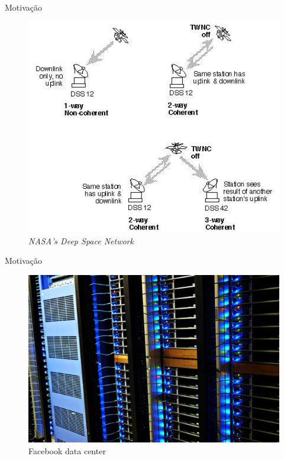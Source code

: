 
  \begin{frame}{Motivação}
   \begin{figure}[h]
     \centering
     \includegraphics[scale=.4]{bsfii6.jpg}
     \caption{\emph{NASA's Deep Space Network}\cite{JPLCIT:2012}}
     \label{fig2:nasa}
   \end{figure}
  \end{frame}

  \begin{frame}{Motivação}
   \begin{figure}[h]
     \centering
     \includegraphics[scale=.5]{facebook-data-center.jpg}
     \caption{Facebook data center\cite{VBFB:2012}}
     \label{fig5:fdc}
   \end{figure}
  \end{frame}


